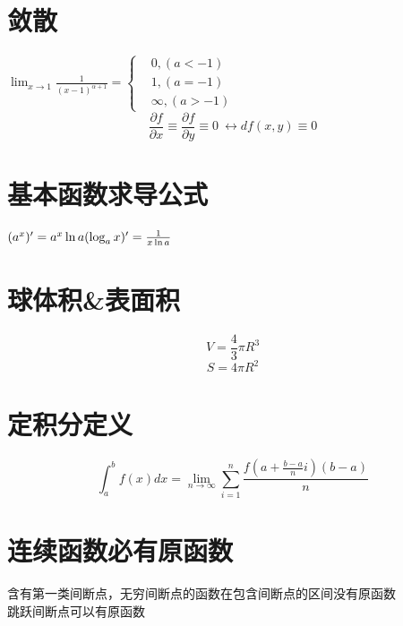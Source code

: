 \documentclass[UTF8]{ctexart}
\begin{document}
\section{敛散}
$ \lim_{x \rightarrow 1} \frac{1}{(x-1)^{α+1}}=
  \begin{cases}
  &0 , (a<-1) \\
  &1 , (a=-1) \\
  &\infty ,(a>-1)
\end{cases}
$
$$ \frac{\partial f}{\partial x} \equiv \frac{\partial f}{\partial y} \equiv 0\ \leftrightarrow df({x,y}) \equiv 0 $$

\section{基本函数求导公式}
$ (a^x)'=a^x \ln a \\
  ( \log _a x)'=\frac{1}{x \ln a} $

\section{球体积\&表面积}
$$ V=\frac{4}{3} \pi R^3$$
$$ S= 4 \pi R^2$$

\section{定积分定义}
$$ \int_a^b f(x)dx= \lim_{n \rightarrow \infty } \sum_{i=1}^n \frac{f \left( a+ \frac{b-a}{n}i \right)(b-a)}{n}$$
\section{连续函数必有原函数}
含有第一类间断点，无穷间断点的函数在包含间断点的区间没有原函数   \\
跳跃间断点可以有原函数 \\
\end{document}
